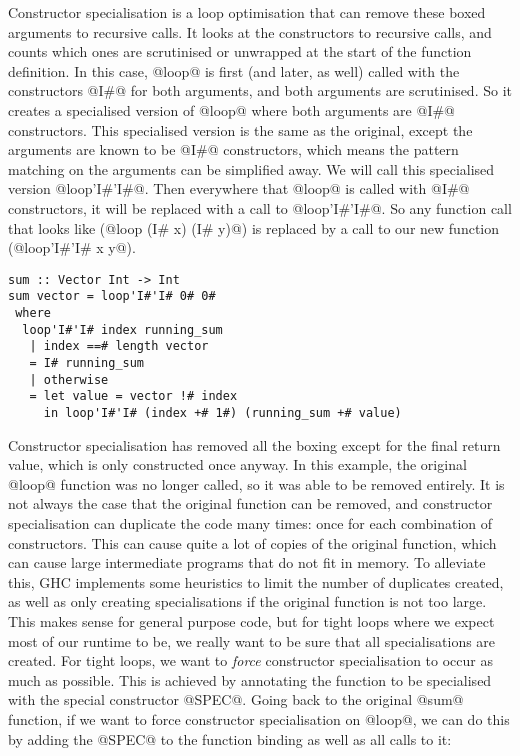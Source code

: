 Constructor specialisation \cite{peyton2007call} is a loop optimisation that can remove these boxed arguments to recursive calls.
It looks at the constructors to recursive calls, and counts which ones are scrutinised or unwrapped at the start of the function definition.
In this case, @loop@ is first (and later, as well) called with the constructors @I#@ for both arguments, and both arguments are scrutinised.
So it creates a specialised version of @loop@ where both arguments are @I#@ constructors.
This specialised version is the same as the original, except the arguments are known to be @I#@ constructors, which means the pattern matching on the arguments can be simplified away.
We will call this specialised version @loop'I#'I#@.
Then everywhere that @loop@ is called with @I#@ constructors, it will be replaced with a call to @loop'I#'I#@.
So any function call that looks like (@loop (I# x) (I# y)@) is replaced by a call to our new function (@loop'I#'I# x y@).

\begin{lstlisting}
sum :: Vector Int -> Int
sum vector = loop'I#'I# 0# 0#
 where
  loop'I#'I# index running_sum
   | index ==# length vector
   = I# running_sum
   | otherwise
   = let value = vector !# index
     in loop'I#'I# (index +# 1#) (running_sum +# value)
\end{lstlisting}

Constructor specialisation has removed all the boxing except for the final return value, which is only constructed once anyway.
In this example, the original @loop@ function was no longer called, so it was able to be removed entirely.
It is not always the case that the original function can be removed, and constructor specialisation can duplicate the code many times: once for each combination of constructors.
This can cause quite a lot of copies of the original function, which can cause large intermediate programs that do not fit in memory.
To alleviate this, GHC implements some heuristics to limit the number of duplicates created, as well as only creating specialisations if the original function is not too large.
This makes sense for general purpose code, but for tight loops where we expect most of our runtime to be, we really want to be sure that all specialisations are created.
For tight loops, we want to \emph{force} constructor specialisation to occur as much as possible.
This is achieved by annotating the function to be specialised with the special constructor @SPEC@.
Going back to the original @sum@ function, if we want to force constructor specialisation on @loop@, we can do this by adding the @SPEC@ to the function binding as well as all calls to it:

